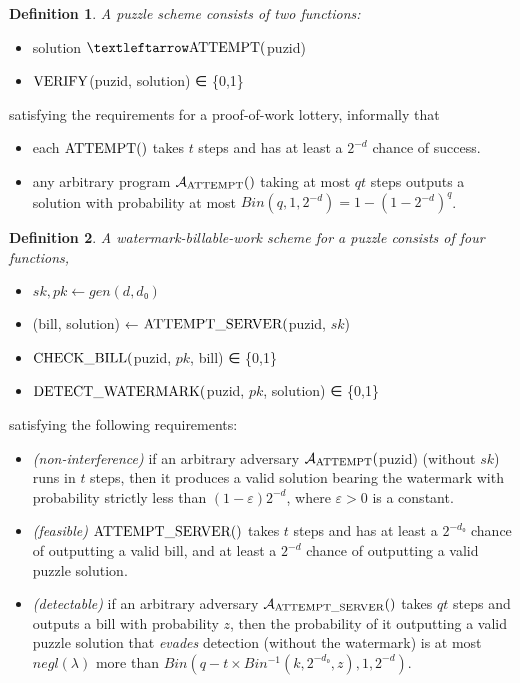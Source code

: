 \documentclass{article}
\newtheorem{definition}{Definition}
\newcommand{\adv}{\mathcal{A}}
\newcommand{\tn}{\textnormal}
\newcommand{\unn}[1]{\uppercase\tn{#1}}
\begin{document}
\begin{definition}A puzzle scheme consists of two functions:
\end{definition}
\begin{itemize}
\item solution $← \unn{attempt}($puzid)
\item  $\unn{verify}$(puzid, solution) ∈ \{0,1\}
\end{itemize}

satisfying the requirements for a proof-of-work lottery, informally that
\begin{itemize}
\item each $\unn{attempt}()$ takes $t$ steps and has at least a $2^{-d}$ chance of success.
\item any arbitrary program $\adv_{\unn{attempt}}()$ taking at most $qt$ steps outputs a solution with probability at most $Bin(q,1,2^{-d}) = 1-(1-2^{-d})^q$.
\end{itemize}


\begin{definition}A watermark-billable-work scheme for a puzzle consists of four functions,
\end{definition}
\begin{itemize}
\item $sk,pk ← gen(d,d₀)$
\item (bill, solution) ← $\unn{attempt\_server}($puzid, $sk$)
\item $\unn{check\_bill}($puzid, $pk$, bill) ∈ \{0,1\}
\item $\unn{detect\_watermark}($puzid, $pk$, solution) ∈ \{0,1\}
\end{itemize}
satisfying the following requirements:
\begin{itemize}
\item {\em (non-interference)} if an arbitrary adversary $\adv_{\unn{attempt}}($puzid) (without $sk$) runs in $t$ steps, then it produces a valid solution bearing the watermark with probability strictly less than $(1-ε)2^{-d}$, where $ε>0$ is a constant.
\item {\em (feasible)} $\unn{attempt\_server}()$ takes $t$ steps and has at least a $2^{-d₀}$ chance of outputting a valid bill, and at least a $2^{-d}$ chance of outputting a valid puzzle solution.
\item {\em (detectable)} if an arbitrary adversary $\adv_{\unn{attempt\_server}}()$ takes $qt$ steps and outputs a bill with probability $z$, then the probability of it outputting a valid puzzle solution that {\em evades} detection  (without the watermark) is at most $negl(λ)$ more than $Bin(q-t×Bin^{-1}(k,2^{-d₀},z), 1, 2^{-d})$.
\end{itemize}
\end{document}
